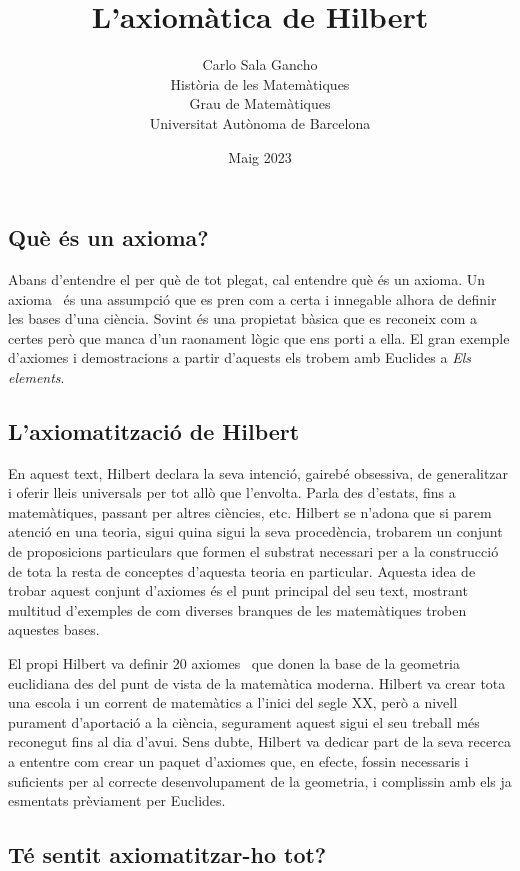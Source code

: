 \documentclass[a4paper, 11pt]{article}
\title{L'axiomàtica de Hilbert}
\author{
  Carlo Sala Gancho\\
  Història de les Matemàtiques\\
  Grau de Matemàtiques\\
  Universitat Autònoma de Barcelona}
\date{Maig 2023}
\begin{document}
\maketitle

\subsection*{Què és un axioma?}

Abans d'entendre el per què de tot plegat, cal entendre què és un axioma. Un axioma~\cite{bib:wiki:axioma} és una
assumpció que es pren com a certa i innegable alhora de definir les bases d'una ciència. Sovint és una propietat bàsica
que es reconeix com a certes però que manca d'un raonament lògic que ens porti a ella. El gran exemple d'axiomes i
demostracions a partir d'aquests els trobem amb Euclides a \textit{Els elements}.

\subsection*{L'axiomatització de Hilbert}

En aquest text, Hilbert declara la seva intenció, gairebé obsessiva, de generalitzar i oferir lleis universals per tot
allò que l'envolta. Parla des d'estats, fins a matemàtiques, passant per altres ciències, etc. Hilbert se n'adona que
si parem atenció en una teoria, sigui quina sigui la seva procedència, trobarem un conjunt de proposicions particulars
que formen el substrat necessari per a la construcció de tota la resta de conceptes d'aquesta teoria en particular.
Aquesta idea de trobar aquest conjunt d'axiomes és el punt principal del seu text, mostrant multitud d'exemples de com
diverses branques de les matemàtiques troben aquestes bases.

El propi Hilbert va definir 20 axiomes~\cite{bib:wiki:hilbert} que donen la base de la geometria euclidiana des del
punt de vista de la matemàtica moderna. Hilbert va crear tota una escola i un corrent de matemàtics a l'inici del segle
XX, però a nivell purament d'aportació a la ciència, segurament aquest sigui el seu treball més reconegut fins al dia
d'avui. Sens dubte, Hilbert va dedicar part de la seva recerca a ententre com crear un paquet d'axiomes que, en efecte,
fossin necessaris i suficients per al correcte desenvolupament de la geometria, i complissin amb els ja esmentats
prèviament per Euclides.

\subsection*{Té sentit axiomatitzar-ho tot?}
\end{document}
